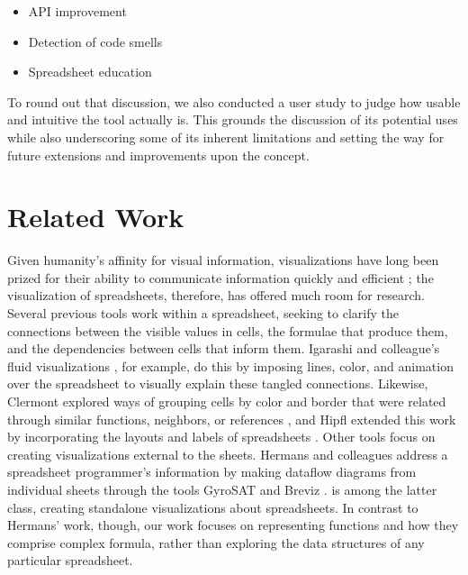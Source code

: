 \documentclass[conference]{IEEEtran}
\begin{document}
	\begin{itemize} \item API improvement \item Detection of code smells \item
		Spreadsheet education \end{itemize}
	
	To round out that discussion, we also conducted a user study to judge how
	usable and intuitive the tool actually is. This grounds the discussion of its
	potential uses while also underscoring some of its inherent limitations and
	setting the way for future extensions and improvements upon the concept.
	
	\section{Related Work} Given humanity's affinity for visual information,
	visualizations have long been prized for their ability to communicate
	information quickly and efficient \cite{baeza1999modern}; the visualization of
	spreadsheets, therefore, has offered much room for research. Several previous
	tools work within a spreadsheet, seeking to clarify the connections between the
	visible values in cells, the formulae that produce them, and the dependencies
	between cells that inform them. Igarashi and colleague's fluid visualizations
	\cite{igarashi1998fluid}, for example, do this by imposing lines, color, and
	animation over the spreadsheet to visually explain these tangled connections.
	Likewise, Clermont explored ways of grouping cells by color and border that
	were related through similar functions, neighbors, or references
	\cite{clermont2003scalable}, and Hipfl extended this work by incorporating the
	layouts and labels of spreadsheets \cite{hipfl2008using}. Other tools focus on
	creating visualizations external to the sheets. Hermans and colleagues address
	a spreadsheet programmer's information by making dataflow diagrams from
	individual sheets through the tools GyroSAT \cite{hermans2011supporting} and
	Breviz \cite{hermans2011breviz}. \toolname is among the latter class, creating
	standalone visualizations about spreadsheets. In contrast to Hermans' work,
	though, our work focuses on representing functions and how they comprise
	complex formula, rather than exploring the data structures of any particular
	spreadsheet.  \par
	
\end{document}
